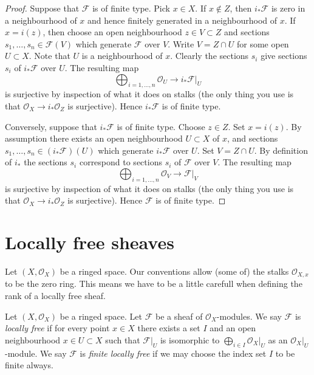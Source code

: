 \begin{proof}
Suppose that $\mathcal{F}$ is of finite type.
Pick $x \in X$. If $x \not \in Z$, then $i_*\mathcal{F}$
is zero in a neighbourhood of $x$ and hence finitely generated in
a neighbourhood of $x$. If $x = i(z)$, then choose an open neighbourhood
$z \in V \subset Z$ and sections $s_1, \ldots, s_n \in \mathcal{F}(V)$
which generate $\mathcal{F}$ over $V$. Write $V = Z \cap U$ for some open
$U \subset X$. Note that $U$ is a neighbourhood of $x$. Clearly the
sections $s_i$ give sections $s_i$ of $i_*\mathcal{F}$ over $U$.
The resulting map
$$
\bigoplus\nolimits_{i = 1, \ldots, n} \mathcal{O}_U
\longrightarrow
i_*\mathcal{F}|_U
$$
is surjective by inspection of what it does on stalks
(the only thing you use is that $\mathcal{O}_X \to i_*\mathcal{O}_Z$
is surjective). Hence $i_*\mathcal{F}$
is of finite type.

\medskip\noindent
Conversely, suppose that $i_*\mathcal{F}$ is of finite type.
Choose $z \in Z$. Set $x = i(z)$. By assumption there exists
an open neighbourhood $U \subset X$ of $x$, and sections
$s_1, \ldots, s_n \in (i_*\mathcal{F})(U)$ which generate $i_*\mathcal{F}$
over $U$. Set $V = Z \cap U$. By definition of $i_*$ the sections
$s_i$ correspond to sections $s_i$ of $\mathcal{F}$ over $V$.
The resulting map
$$
\bigoplus\nolimits_{i = 1, \ldots, n} \mathcal{O}_V
\longrightarrow
\mathcal{F}|_V
$$
is surjective by inspection of what it does on stalks
(the only thing you use is that $\mathcal{O}_X \to i_*\mathcal{O}_Z$
is surjective). Hence $\mathcal{F}$ is of finite type.
\end{proof}











\section{Locally free sheaves}
\label{section-locally-free}

\noindent
Let $(X, \mathcal{O}_X)$ be a ringed space.
Our conventions allow (some of) the stalks $\mathcal{O}_{X, x}$
to be the zero ring. This means we have to be a little carefull
when defining the rank of a locally free sheaf.

\begin{definition}
\label{definition-locally-free}
Let $(X, \mathcal{O}_X)$ be a ringed space.
Let $\mathcal{F}$ be a sheaf of $\mathcal{O}_X$-modules.
We say $\mathcal{F}$ is {\it locally free} if for every
point $x \in X$ there exists a set $I$ and an open
neighbourhood $x \in U \subset X$
such that $\mathcal{F}|_U$ is isomorphic to
$\bigoplus_{i \in I} \mathcal{O}_X|_U$ as an $\mathcal{O}_X|_U$-module.
We say $\mathcal{F}$ is {\it finite locally free} if we may
choose the index set $I$ to be finite always.
\end{definition}

